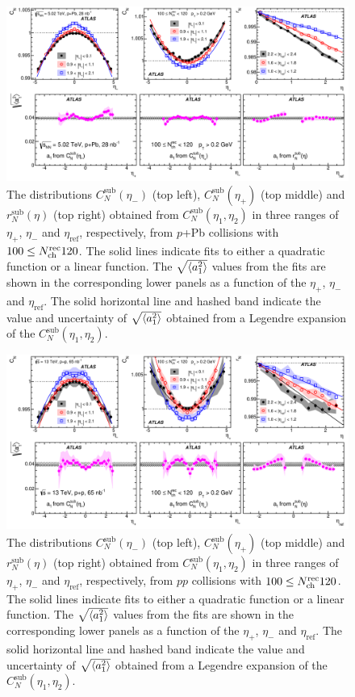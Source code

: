 \begin{figure}[H]
\centering
\includegraphics[width=.95\linewidth]{figs/chapter_fbcorr/ATLAS_proj_pPb.pdf}
\caption{The distributions $C_N^\text{sub}(\eta_-)$ (top left), $C_N^\text{sub}(\eta_+)$ (top middle) and $r_N^\text{sub}(\eta)$ (top right) obtained from $C_N^\text{sub}(\eta_1, \eta_2)$ in three ranges of $\eta_+$, $\eta_-$ and $\eta_\text{ref}$, respectively, from $p$+Pb collisions with $100 \le N_\text{ch}^\text{rec} 120$. The solid lines indicate fits to either a quadratic function or a linear function. The $\sqrt{\left\langle a_1^2\right\rangle}$ values from the fits are shown in the corresponding lower panels as a function of the $\eta_+$, $\eta_-$ and $\eta_\text{ref}$. The solid horizontal line and hashed band indicate the value and uncertainty of $\sqrt{\left\langle a_1^2\right\rangle}$ obtained from a Legendre expansion of the $C_N^\text{sub}(\eta_1, \eta_2)$.}
\label{fig:fbcorr_ATLAS_proj_pPb}
\end{figure}

\begin{figure}[H]
\centering
\includegraphics[width=.95\linewidth]{figs/chapter_fbcorr/ATLAS_proj_pp.pdf}
\caption{The distributions $C_N^\text{sub}(\eta_-)$ (top left), $C_N^\text{sub}(\eta_+)$ (top middle) and $r_N^\text{sub}(\eta)$ (top right) obtained from $C_N^\text{sub}(\eta_1, \eta_2)$ in three ranges of $\eta_+$, $\eta_-$ and $\eta_\text{ref}$, respectively, from $pp$ collisions with $100 \le N_\text{ch}^\text{rec} 120$. The solid lines indicate fits to either a quadratic function or a linear function. The $\sqrt{\left\langle a_1^2\right\rangle}$ values from the fits are shown in the corresponding lower panels as a function of the $\eta_+$, $\eta_-$ and $\eta_\text{ref}$. The solid horizontal line and hashed band indicate the value and uncertainty of $\sqrt{\left\langle a_1^2\right\rangle}$ obtained from a Legendre expansion of the $C_N^\text{sub}(\eta_1, \eta_2)$.}
\label{fig:fbcorr_ATLAS_proj_pp}
\end{figure}

